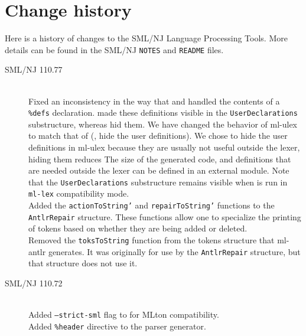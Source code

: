 %
\chapter{Change history}
\label{ch:history}

Here is a history of changes to the SML/NJ Language Processing Tools.
More details can be found in the SML/NJ \texttt{NOTES} and \texttt{README} files.
\begin{description}
  \item[SML/NJ 110.77]
    \mbox{}\\[0.5em]
    Fixed an inconsistency in the way that \mlantlr{} and \ulex{} handled the contents of
    a \texttt{\%defs} declaration.  \ulex{} made these definitions visible in the \texttt{UserDeclarations}
    substructure, whereas \mlantlr{} hid them.  We have changed the behavior of ml-ulex to match
    that of \mlantlr{} (\ie{}, hide the user definitions).  We chose to hide the user definitions
    in ml-ulex because they are usually not useful outside the lexer, hiding them reduces The
    size of the generated code, and definitions that are needed outside the lexer can be
    defined in an external module.  Note that the \texttt{UserDeclarations} substructure remains
    visible when \ulex{} is run in \texttt{ml-lex} compatibility mode.
    \\[0.5em]
    Added the \texttt{actionToString'} and \texttt{repairToString'} functions
    to the \texttt{AntlrRepair} structure.  These functions allow one to
    specialize the printing of tokens based on whether they are being added or deleted.
    \\[0.5em]
    Removed the \texttt{toksToString} function from the tokens structure that ml-antlr
    generates.  It was originally for use by the \texttt{AntlrRepair} structure, but that
    structure does not use it.
  \item[SML/NJ 110.72]
    \mbox{}\\[0.5em]
    Added \texttt{--strict-sml} flag to \ulex{} for MLton compatibility.
    \\[0.5em]
    Added \texttt{\%header} directive to the \mlantlr{} parser generator.
\end{description}%
